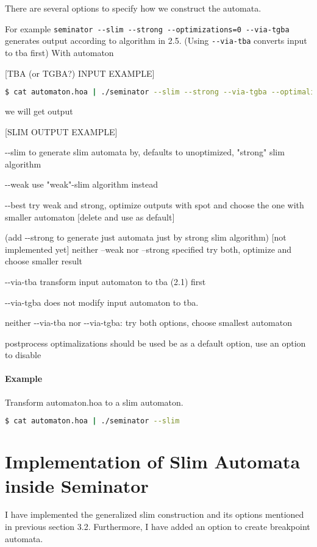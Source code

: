 \documentclass[
	digital
nolof, nolot
]{fithesis3}
\begin{document}
		There are several options to specify how we construct the automata.
		
		For example \texttt{seminator -{}-slim -{}-strong -{}-optimizations=0 -{}-via-tgba} generates output according to algorithm in 2.5. (Using \texttt{-{}-via-tba} converts input to tba first) With automaton
		
		[TBA (or TGBA?) INPUT EXAMPLE]
		
		\begin{lstlisting}[language=bash]
$ cat automaton.hoa | ./seminator --slim --strong --via-tgba --optimalizations=0
		\end{lstlisting}
		
		we will get output
		
		[SLIM OUTPUT EXAMPLE]
		 
		
		-{}-slim to generate slim automata by, defaults to unoptimized, "strong" slim algorithm
		
		-{}-weak use "weak"-slim algorithm instead
		
		-{}-best try weak and strong, optimize outputs with spot and choose the one with smaller automaton [delete and use as default]
		
		(add -{}-strong to generate just automata just by strong slim algorithm)
		[not implemented yet] neither --weak nor --strong specified try both, optimize and choose smaller result
		
		-{}-via-tba transform input automaton to tba (2.1) first
		
		-{}-via-tgba does not modify input automaton to tba.
		
		neither -{}-via-tba nor -{}-via-tgba: try both options, choose smallest automaton
		
		postprocess optimalizations  should be used be as a default option, use an option to disable
		
		\paragraph{Example}
		Transform automaton.hoa to a slim automaton.
		\begin{lstlisting}[language=bash]
$ cat automaton.hoa | ./seminator --slim
		\end{lstlisting}
	\section{Implementation of Slim Automata inside Seminator}
	I have implemented the generalized slim construction and its options mentioned in previous section 3.2. Furthermore, I have added an option to create breakpoint automata.
	
\end{document}
